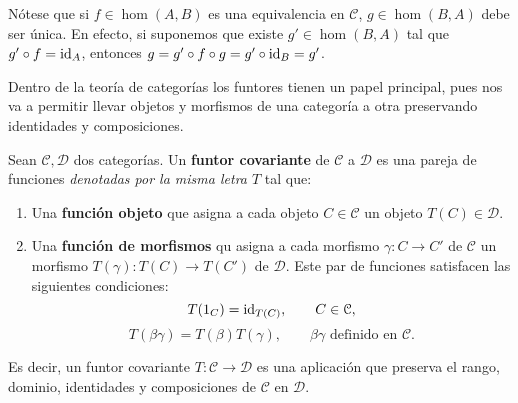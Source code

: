 Nótese que si \(f \in \hom(A,B)\) es una equivalencia en \(\mathcal{C}\),
\(g \in \hom(B,A)\) debe ser única. En efecto, si suponemos que existe
\(g' \in \hom(B,A)\) tal que \(g' \circ f = \operatorname{id}_{A}\), entonces \(g = g'\circ f \circ
g = g' \circ \operatorname{id}_{B}= g'\).

Dentro de la teoría de categorías los funtores tienen un papel principal, pues
nos va a permitir llevar objetos y morfismos de una categoría a otra preservando
identidades y composiciones.

\begin{definicion}
	Sean \(\mathcal{C}, \mathcal{D}\) dos categorías. Un \textbf{funtor covariante} de
	\(\mathcal{C}\) a \(\mathcal{D}\) es una pareja de funciones \textit{denotadas por
		la misma letra \(T\)} tal que:
	\begin{enumerate}
		\item Una \textbf{función objeto} que asigna a cada objeto
		\(C \in \mathcal{C}\) un objeto \(T(C) \in \mathcal{D}\).
		
		\item Una \textbf{función de morfismos} qu asigna a cada morfismo
		\(\gamma: C \rightarrow C'\) de \(\mathcal{C}\) un morfismo
		\(T(\gamma): T(C) \rightarrow T(C')\) de \(\mathcal{D}\). Este par de funciones
		satisfacen las siguientes condiciones:
		\begin{equation}
			T(1_{C}) = \operatorname{id}_{T(C)}, \qquad C \in \mathcal{C},
		\end{equation}
		\begin{equation}
			T(\beta \gamma) = T(\beta)T(\gamma), \qquad \beta \gamma \text{ definido
				en }\mathcal{C}.
		\end{equation}
	\end{enumerate}
\end{definicion}

Es decir, un funtor covariante \(T: \mathcal{C}\rightarrow \mathcal{D}\) es una
aplicación que preserva el rango, dominio, identidades y composiciones de
\(\mathcal{C}\) en \(\mathcal{D}\).

%

